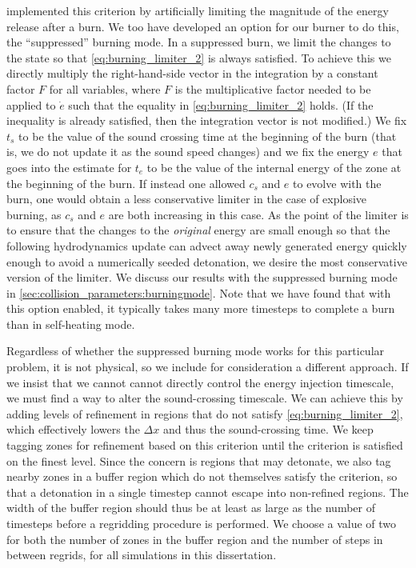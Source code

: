 \documentclass[12pt]{article}
\begin{document}
\citet{kushnir:2013} implemented this criterion by artificially 
limiting the magnitude of the energy release after a burn. We
too have developed an option for our burner to do this,
the ``suppressed'' burning mode. In a suppressed burn, we limit
the changes to the state so that \autoref{eq:burning_limiter_2}
is always satisfied. To achieve this we directly multiply the
right-hand-side vector in the integration by a constant factor $F$
for all variables, where $F$ is the multiplicative factor needed to
be applied to $\dot{e}$ such that the equality in \autoref{eq:burning_limiter_2}
holds. (If the inequality is already satisfied, then the integration
vector is not modified.) We fix $t_s$ to be the value of the sound
crossing time at the beginning of the burn (that is, we do not
update it as the sound speed changes) and we fix the energy $e$
that goes into the estimate for $t_e$ to be the value of the
internal energy of the zone at the beginning of the burn. If
instead one allowed $c_s$ and $e$ to evolve with the burn, one
would obtain a less conservative limiter in the case of explosive
burning, as $c_s$ and $e$ are both increasing in this case.
As the point of the limiter is to ensure that the changes to the
\textit{original} energy are small enough so that the following
hydrodynamics update can advect away newly generated energy
quickly enough to avoid a numerically seeded detonation,
we desire the most conservative version of the limiter. We discuss
our results with the suppressed burning mode in \autoref{sec:collision_parameters:burningmode}.
Note that we have found that with this option enabled, it typically takes
many more timesteps to complete a burn than in self-heating mode.

Regardless of whether the suppressed burning mode works for this
particular problem, it is not physical, so we include for
consideration a different approach. If we insist that we cannot
cannot directly control the energy injection timescale, we 
must find a way to alter the sound-crossing timescale. 
We can achieve this by adding levels of refinement in 
regions that do not satisfy \autoref{eq:burning_limiter_2},
which effectively lowers the $\Delta x$ and thus the
sound-crossing time. We keep tagging zones for refinement
based on this criterion until the criterion is satisfied
on the finest level. Since the concern is regions that 
may detonate, we also tag nearby zones in a buffer region
which do not themselves satisfy the criterion,
so that a detonation in a single timestep cannot 
escape into non-refined regions. The width of the buffer 
region should thus be at least as large as the number of 
timesteps before a regridding procedure is performed.
We choose a value of two for both the number of zones in the 
buffer region and the number of steps in between regrids,
for all simulations in this dissertation.
\end{document}

